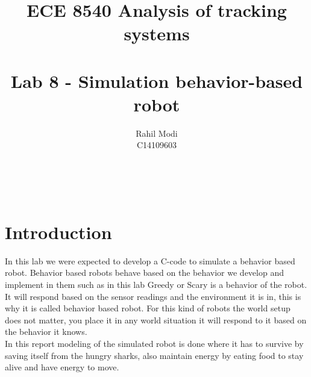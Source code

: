 \documentclass[12pt]{article}
\begin{document}

\title{\Huge{\bf ECE 8540 Analysis of tracking systems}\\ 
\\ 
\huge Lab 8 - Simulation behavior-based robot}\\
\author{\LARGE Rahil Modi\\
C14109603}
\maketitle
\clearpage
\section{Introduction}
In this lab we were expected to develop a C-code to simulate a behavior based robot. Behavior based robots behave based on the behavior we develop and implement in them such as in this lab Greedy or Scary is a behavior of the robot. It will respond based on the sensor readings and the environment it is in, this is why it is called behavior based robot. For this kind of robots the world setup does not matter, you place it in any world situation it will respond to it based on the behavior it knows.\\
In this report modeling of the simulated robot is done where it has to survive by saving itself from the hungry sharks, also maintain energy by eating food to stay alive and have energy to move.
\end{document}
